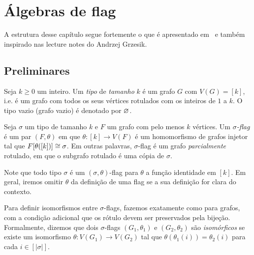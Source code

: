 \chapter{Álgebras de flag}
\label{cap:flag-algebras}



A estrutura desse capítulo segue fortemente o que é apresentado em~\cite{marcel2016flag} e também inspirado nas lecture notes do Andrzej Grzesik.

\section{Preliminares}

Seja $k \geq 0$ um inteiro.
Um \emph{tipo} de \emph{tamanho} $k$ é um grafo $G$ com $V(G) = [k]$,
i.e. é um grafo com todos os seus vértices rotulados com os inteiros de $1$ a $k$.
O tipo vazio (grafo vazio) é denotado por $\varnothing$.

Seja $\sigma$ um tipo de tamanho $k$ e $F$ um grafo com pelo menos $k$ vértices.
Um \emph{$\sigma$-flag} é um par $(F,\theta)$ em que $\theta \colon [k] \to V(F)$
é um homomorfismo de grafos injetor tal que $F[\theta([k])] \cong \sigma$.
Em outras palavras, $\sigma$-flag é um grafo \emph{parcialmente} rotulado, em que o subgrafo rotulado é uma cópia de $\sigma$.

Note que todo tipo $\sigma$ é um $(\sigma,\theta)$-flag para $\theta$ a função identidade em $[k]$.
Em geral, iremos omitir $\theta$ da definição de uma flag se a sua definição for clara do contexto.

Para definir isomorfismos entre $\sigma$-flags, fazemos exatamente como para grafos, com a condição adicional que os rótulo devem ser preservados pela bijeção.
Formalmente, dizemos que dois $\sigma$-flags $(G_1,\theta_1)$ e $(G_2,\theta_2)$ são \emph{isomórficos} se existe um isomorfismo $\theta \colon V(G_1) \to V(G_2)$ tal que $\theta(\theta_1(i))=\theta_2(i)$ para cada $i \in [|\sigma|]$.

